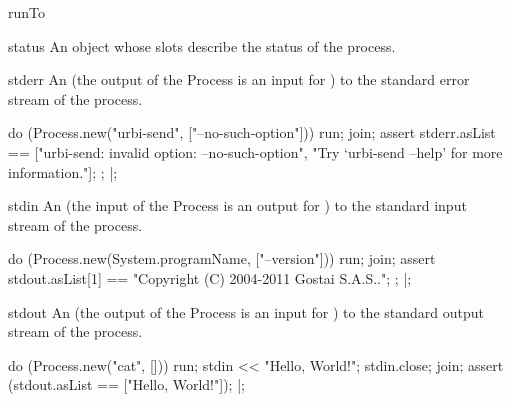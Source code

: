 \begin{urbiscriptapi}
\item[runTo]
\item[status] An object whose slots describe the status of the
  process.
\item[stderr] An  (the output of the Process is
  an input for \urbi) to the standard error stream of the process.
\begin{urbiscript}
do (Process.new("urbi-send", ["--no-such-option"]))
{
  run;
  join;
  assert
  {
    stderr.asList ==
    ["urbi-send: invalid option: --no-such-option",
     "Try `urbi-send --help' for more information."];
  };
}|;
\end{urbiscript}

\item[stdin] An  (the input of the Process is
  an output for \urbi) to the standard input stream of the process.
\begin{urbiscript}
do (Process.new(System.programName, ["--version"]))
{
  run;
  join;
  assert
  {
    stdout.asList[1] == "Copyright (C) 2004-2011 Gostai S.A.S..";
  };
}|;
\end{urbiscript}

\item[stdout] An  (the output of the Process is
  an input for \urbi) to the standard output stream of the process.
\begin{urbiscript}
do (Process.new("cat", []))
{
  run;
  stdin << "Hello, World!\n";
  stdin.close;
  join;
  assert (stdout.asList == ["Hello, World!"]);
}|;
\end{urbiscript}
\end{urbiscriptapi}


